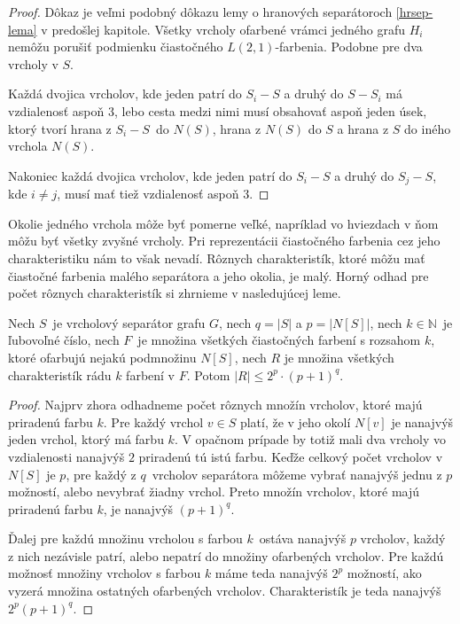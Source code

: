 \begin{proof}
    Dôkaz je veľmi podobný dôkazu lemy o hranových separátoroch \ref{hrsep-lema} v predošlej kapitole. Všetky
    vrcholy ofarbené vrámci jedného grafu $H_i$ nemôžu porušiť podmienku čiastočného $L(2,1)$-farbenia. Podobne
    pre dva vrcholy v $S$.
    
    Každá dvojica vrcholov, kde jeden patrí do $S_i - S$ a druhý do $S - S_i$ má vzdialenosť
    aspoň $3$, lebo cesta medzi nimi musí obsahovať aspoň jeden úsek, ktorý tvorí hrana z $S_i - S$ do $N(S)$, hrana
    z $N(S)$ do $S$ a hrana z $S$ do iného vrchola $N(S)$.

    Nakoniec každá dvojica vrcholov, kde jeden patrí do $S_i - S$ a druhý do $S_j - S$, kde $i \neq j$, musí mať tiež
    vzdialenosť aspoň $3$.
\end{proof}

Okolie jedného vrchola môže byť pomerne veľké, napríklad vo hviezdach v ňom môžu byť všetky zvyšné vrcholy.
Pri reprezentácii čiastočného farbenia cez jeho charakteristiku nám to však nevadí. Rôznych charakteristík,
ktoré môžu mať čiastočné farbenia malého separátora a jeho okolia, je malý. Horný odhad pre počet rôznych
charakteristík si zhrnieme v nasledujúcej leme.

\begin{lema}
    Nech $S$ je vrcholový separátor grafu $G$, nech $q = |S|$ a $p = |N[S]|$, nech $k \in \mathbb{N}$ je ľubovoľné
    číslo, nech $F$ je množina všetkých čiastočných farbení s rozsahom $k$, ktoré ofarbujú nejakú podmnožinu $N[S]$,
    nech $R$ je množina všetkých charakteristík rádu $k$ farbení v $F$. Potom $|R| \leq 2^p \cdot (p+1)^{q}$.
\end{lema}
\begin{proof}
    Najprv zhora odhadneme počet rôznych množín vrcholov, ktoré majú priradenú farbu $k$. Pre každý vrchol
    $v \in S$ platí, že v jeho okolí $N[v]$ je nanajvýš jeden vrchol, ktorý má farbu $k$. V opačnom prípade by totiž
    mali dva vrcholy vo vzdialenosti nanajvýš $2$ priradenú tú istú farbu. Keďže celkový počet vrcholov
    v $N[S]$ je $p$, pre každý z $q$ vrcholov separátora môžeme vybrať nanajvýš jednu z $p$ možností, alebo
    nevybrať žiadny vrchol. Preto množín vrcholov, ktoré majú priradenú farbu $k$, je nanajvýš $(p+1)^q$.

    Ďalej pre každú množinu vrcholou s farbou $k$ ostáva nanajvýš $p$ vrcholov, každý z nich nezávisle
    patrí, alebo nepatrí do množiny ofarbených vrcholov. Pre každú možnosť množiny vrcholov s farbou $k$
    máme teda nanajvýš $2^p$ možností, ako vyzerá množina ostatných ofarbených vrcholov. Charakteristík
    je teda nanajvýš $2^p (p+1)^q$.
\end{proof}

